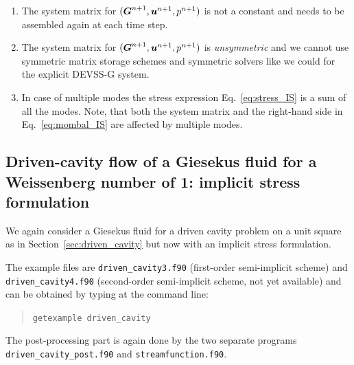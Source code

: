 \begin{enumerate}
         $(\ten G^{n+1},\vek u^{n+1},p^{n+1})$ is computed and
         subsequently the solution
         vector for $\ten c^{n+1}$. This is different from the explicit stress
         formulation where first $\ten c^{n+1}$ is computed and subsequently
         $(\ten G^{n+1},\vek u^{n+1},p^{n+1})$.
   \item The system matrix for $(\ten G^{n+1},\vek u^{n+1},p^{n+1})$ is not a
         constant and needs to be assembled again at each time step.
   \item The system matrix for $(\ten G^{n+1},\vek u^{n+1},p^{n+1})$ is
         \emph{unsymmetric} and we cannot use symmetric matrix
         storage schemes and symmetric solvers like we could for the explicit 
         DEVSS-G system.
   \item In case of multiple modes the stress expression
         Eq.~\eqref{eq:stress_IS} is a sum of all the modes. Note, that both
the system matrix and the right-hand side in Eq.~\eqref{eq:mombal_IS} are
affected by multiple modes.
\end{enumerate}

\subsection{Driven-cavity flow of a Giesekus fluid for a Weissenberg number of
1: implicit stress formulation}
\label{sec:driven_cavity_IS}

We again consider a Giesekus fluid for a driven cavity problem on a unit square
as in Section~\ref{sec:driven_cavity} but now with an implicit stress
formulation.

The example files are \texttt{driven\_cavity3.f90} (first-order semi-implicit
scheme) and \newline
\texttt{driven\_cavity4.f90}  (second-order semi-implicit
scheme, not yet available) and can be obtained by typing at the
command line:
\medskip
\begin{quote}
   \texttt{getexample driven\_cavity}
\end{quote}
The post-processing part is again done by the two separate programs
\texttt{driven\_cavity\_post.f90} and \texttt{streamfunction.f90}.

